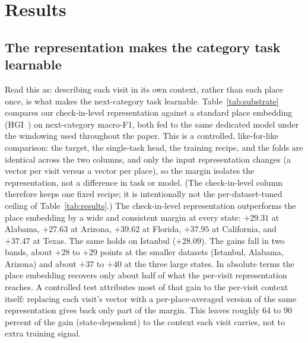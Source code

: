 \section{Results}
\label{sec:results}

\subsection{The representation makes the category task learnable}
\label{sec:results-part1}
Read this as: describing each visit in its own context, rather than each
place once, is what makes the next-category task learnable. Table~\ref{tab:substrate}
compares our check-in-level representation against a standard place embedding
(HGI~\cite{huang2023hgi}) on next-category macro-F1, both fed to the
same dedicated model under the windowing used throughout the paper. This is a
controlled, like-for-like comparison: the target, the single-task head, the
training recipe, and the
folds are identical across the two columns, and only the input representation
changes (a vector per visit versus a vector per place), so the margin isolates the
representation, not a difference in task or model. (The check-in-level column therefore keeps one fixed recipe; it is
intentionally not the per-dataset-tuned ceiling of Table~\ref{tab:results}.) The check-in-level
representation outperforms the place embedding by a wide and consistent margin at every
state: $+29.31$ at Alabama, $+27.63$ at Arizona, $+39.62$ at Florida, $+37.95$
at California, and $+37.47$ at Texas. The same holds on Istanbul ($+28.09$).
The gains fall in two bands, about $+28$ to $+29$ points at the smaller datasets
(Istanbul, Alabama, Arizona) and about $+37$ to $+40$ at the three large states.
In absolute terms the place embedding recovers only about half of
what the per-visit representation reaches. A controlled test attributes most of that gain
to the per-visit context itself: replacing each visit's vector with a
per-place-averaged version of the same representation gives back only part of
the margin. This leaves roughly 64 to 90 percent of the gain (state-dependent) to
the context each visit carries, not to extra training signal.

